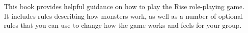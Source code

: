 \documentclass[twocolumn,oneside,letterpaper]{book} %
\begin{document}
\tableofcontents

This book provides helpful guidance on how to play the Rise role-playing game.
It includes rules describing how monsters work, as well as a number of optional rules that you can use to change how the game works and feels for your group.













\appendix
\end{document}
